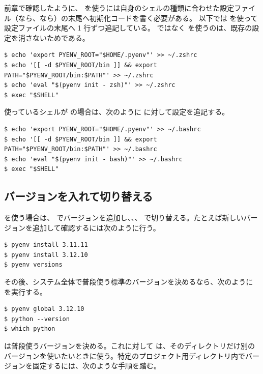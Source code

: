 前章で確認したように、 を使うには自身のシェルの種類に合わせた設定ファイル（なら、なら）の末尾へ初期化コードを書く必要がある。
以下では \code{>>} を使って設定ファイルの末尾へ 1 行ずつ追記している。\code{>} ではなく \code{>>} を使うのは、既存の設定を消さないためである。

\begin{lstlisting}[numbers=none, xleftmargin=2\zw]
$ echo 'export PYENV_ROOT="$HOME/.pyenv"' >> ~/.zshrc
$ echo '[[ -d $PYENV_ROOT/bin ]] && export PATH="$PYENV_ROOT/bin:$PATH"' >> ~/.zshrc
$ echo 'eval "$(pyenv init - zsh)"' >> ~/.zshrc
$ exec "$SHELL"
\end{lstlisting}

使っているシェルが  の場合は、次のように  に対して設定を追記する。

\begin{lstlisting}[numbers=none, xleftmargin=2\zw]
$ echo 'export PYENV_ROOT="$HOME/.pyenv"' >> ~/.bashrc
$ echo '[[ -d $PYENV_ROOT/bin ]] && export PATH="$PYENV_ROOT/bin:$PATH"' >> ~/.bashrc
$ echo 'eval "$(pyenv init - bash)"' >> ~/.bashrc
$ exec "$SHELL"
\end{lstlisting}

\subsection{バージョンを入れて切り替える}

 を使う場合は、 でバージョンを追加し、、、 で切り替える。たとえば新しいバージョンを追加して確認するには次のように行う。

\begin{lstlisting}[numbers=none, xleftmargin=2\zw]
$ pyenv install 3.11.11
$ pyenv install 3.12.10
$ pyenv versions
\end{lstlisting}

その後、システム全体で普段使う標準のバージョンを決めるなら、次のように  を実行する。

\begin{lstlisting}[numbers=none, xleftmargin=2\zw]
$ pyenv global 3.12.10
$ python --version
$ which python
\end{lstlisting}

 は普段使うバージョンを決める。これに対して  は、そのディレクトリだけ別のバージョンを使いたいときに使う。特定のプロジェクト用ディレクトリ内でバージョンを固定するには、次のような手順を踏む。

